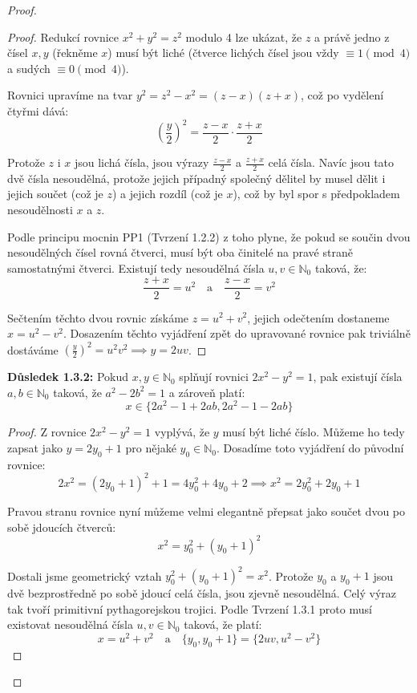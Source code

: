 \documentclass[a4paper,12pt]{article}
\begin{document}
\begin{proof}
\begin{proof}
Redukcí rovnice $x^2 + y^2 = z^2$ modulo 4 lze ukázat, že $z$ a právě jedno z čísel $x, y$ (řekněme $x$) musí být liché (čtverce lichých čísel jsou vždy $\equiv 1 \pmod 4$ a sudých $\equiv 0 \pmod 4$).

Rovnici upravíme na tvar $y^2 = z^2 - x^2 = (z - x)(z + x)$, což po vydělení čtyřmi dává:
$$\left(\frac{y}{2}\right)^2 = \frac{z - x}{2} \cdot \frac{z + x}{2}$$

Protože $z$ i $x$ jsou lichá čísla, jsou výrazy $\frac{z-x}{2}$ a $\frac{z+x}{2}$ celá čísla. Navíc jsou tato dvě čísla nesoudělná, protože jejich případný společný dělitel by musel dělit i jejich součet (což je $z$) a jejich rozdíl (což je $x$), což by byl spor s předpokladem nesoudělnosti $x$ a $z$.

Podle principu mocnin PP1 (Tvrzení 1.2.2) z toho plyne, že pokud se součin dvou nesoudělných čísel rovná čtverci, musí být oba činitelé na pravé straně samostatnými čtverci. Existují tedy nesoudělná čísla $u, v \in \mathbb{N}_0$ taková, že:
$$\frac{z + x}{2} = u^2 \quad \text{a} \quad \frac{z - x}{2} = v^2$$

Sečtením těchto dvou rovnic získáme $z = u^2 + v^2$, jejich odečtením dostaneme $x = u^2 - v^2$. Dosazením těchto vyjádření zpět do upravované rovnice pak triviálně dostáváme $\left(\frac{y}{2}\right)^2 = u^2 v^2 \implies y = 2uv$.
\end{proof}

\vspace{1em}
\textbf{Důsledek 1.3.2:} Pokud $x, y \in \mathbb{N}_0$ splňují rovnici $2x^2 - y^2 = 1$, pak existují čísla $a, b \in \mathbb{N}_0$ taková, že $a^2 - 2b^2 = 1$ a zároveň platí:
$$x \in \{2a^2 - 1 + 2ab, 2a^2 - 1 - 2ab\}$$

\begin{proof}
Z rovnice $2x^2 - y^2 = 1$ vyplývá, že $y$ musí být liché číslo. Můžeme ho tedy zapsat jako $y = 2y_0 + 1$ pro nějaké $y_0 \in \mathbb{N}_0$. Dosadíme toto vyjádření do původní rovnice:
$$2x^2 = (2y_0 + 1)^2 + 1 = 4y_0^2 + 4y_0 + 2 \implies x^2 = 2y_0^2 + 2y_0 + 1$$

Pravou stranu rovnice nyní můžeme velmi elegantně přepsat jako součet dvou po sobě jdoucích čtverců:
$$x^2 = y_0^2 + (y_0 + 1)^2$$

Dostali jsme geometrický vztah $y_0^2 + (y_0 + 1)^2 = x^2$. Protože $y_0$ a $y_0 + 1$ jsou dvě bezprostředně po sobě jdoucí celá čísla, jsou zjevně nesoudělná. Celý výraz tak tvoří primitivní pythagorejskou trojici. Podle Tvrzení 1.3.1 proto musí existovat nesoudělná čísla $u, v \in \mathbb{N}_0$ taková, že platí:
$$x = u^2 + v^2 \quad \text{a} \quad \{y_0, y_0 + 1\} = \{2uv, u^2 - v^2\}$$


\end{proof}
\end{proof}
\end{document}
